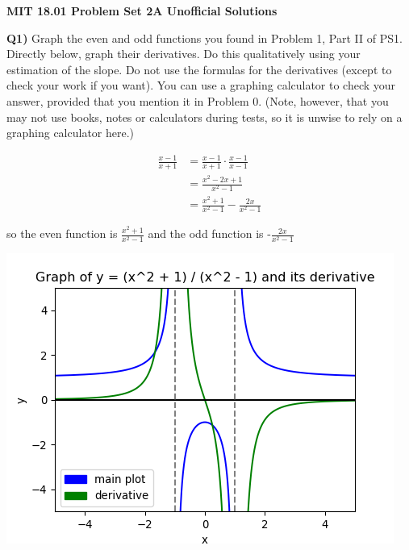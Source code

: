 \documentclass[9pt]{article}
\begin{document}
\begin{center}
  \large\textbf{MIT 18.01 Problem Set 2A Unofficial Solutions}
\end{center}

\begin{tcolorbox}
  \textbf{Q1)} Graph the even and odd functions you found in Problem 1, Part II of PS1. Directly below, graph their derivatives. Do this qualitatively using your estimation of the slope. Do not use the formulas for the derivatives (except to check your work if you want). You can use a graphing calculator to check your answer, provided that you mention it in Problem 0. (Note, however, that you may not use books, notes or calculators during tests, so it is unwise to rely on a graphing calculator here.)
\end{tcolorbox}

\begin{align*}
  \frac{x - 1}{x + 1} &= \frac{x - 1}{x + 1} \cdot \frac{x - 1}{x - 1}\\
                      &= \frac{x^2 - 2x + 1}{x^2 - 1}\\
                      &= \frac{x^2 + 1}{x^2 - 1} - \frac{2x}{x^2 - 1}
\end{align*}

so the even function is $\frac{x^2 + 1}{x^2 - 1}$ and the odd function is -$\frac{2x}{x^2 - 1}$

\begin{center}
  \includegraphics[scale=0.8]{q1_even.png}
\end{center}
\end{document}
